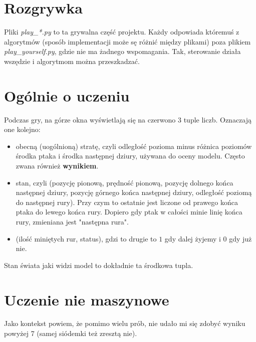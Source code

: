 \documentclass[12pt, A4]{article}
\begin{document}
\section{Rozgrywka}
Pliki \textit{play\_*.py} to ta grywalna część projektu. Każdy odpowiada któremuś z algorytmów (sposób implementacji może sę różnić między plikami) poza plikiem \textit{play\_yourself.py}, gdzie nie ma żadnego wspomagania. Tak, sterowanie działa wszędzie i algorytmom można przeszkadzać.


\section{Ogólnie o uczeniu}
Podczas gry, na górze okna wyświetlają się na czerwono 3 tuple liczb. Oznaczają one kolejno:
\begin{itemize}
	\item obecną (uogólnioną) stratę, czyli odległość pozioma minus różnica poziomów środka ptaka i środka następnej dziury, używana do oceny modelu. Często zwana również \textbf{wynikiem}.
	\item stan, czyli (pozycję pionową, prędność pionową, pozycję dolnego końca następnej dziury, pozycję górnego końca następnej dziury, odległość poziomą do następnej rury). Przy czym to ostatnie jest liczone od prawego końca ptaka do lewego końca rury. Dopiero gdy ptak w całości minie linię końca rury, zmieniana jest "następna rura".
	\item (ilość miniętych rur, status), gdzi to drugie to $1$ gdy dalej żyjemy i $0$ gdy już nie.
\end{itemize}
Stan świata jaki widzi model to dokładnie ta środkowa tupla.


\section{Uczenie nie maszynowe}
Jako kontekst powiem, że pomimo wielu prób, nie udało mi się zdobyć wyniku powyżej 7 (samej siódemki też zresztą nie).
\end{document}
